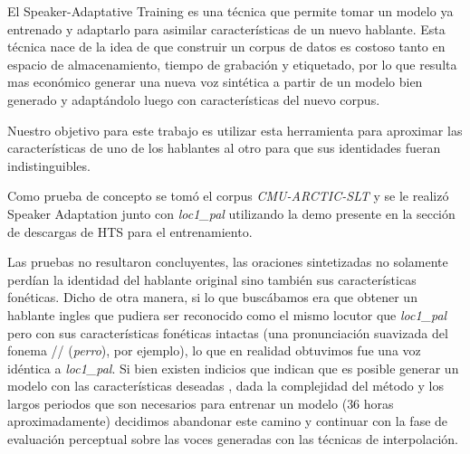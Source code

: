 El Speaker-Adaptative Training es una técnica que permite tomar un modelo ya entrenado y adaptarlo para asimilar características de un nuevo hablante. Esta técnica nace de la idea de que construir un corpus de datos es costoso tanto en espacio de almacenamiento, tiempo de grabación y etiquetado, por lo que resulta mas económico generar una nueva voz sintética a partir de un modelo bien generado y adaptándolo luego con características del nuevo corpus.

Nuestro objetivo para este trabajo es utilizar esta herramienta para aproximar las características de uno de los hablantes al otro para que sus identidades fueran indistinguibles.

Como prueba de concepto se tomó el corpus \textit{CMU-ARCTIC-SLT} y se le realizó Speaker Adaptation junto con \textit{loc1\_pal} utilizando la demo presente en la sección de descargas de HTS para el entrenamiento. 

Las pruebas no resultaron concluyentes, las oraciones sintetizadas no solamente perdían la identidad del hablante original sino también sus características fonéticas. Dicho de otra manera, si lo que buscábamos era que obtener un hablante ingles que pudiera ser reconocido como el mismo locutor que \textit{loc1\_pal} pero con sus características fonéticas intactas (una pronunciación suavizada del fonema // (\textit{perro}), por ejemplo), lo que en realidad obtuvimos fue una voz idéntica a \textit{loc1\_pal}. Si bien existen indicios que indican que es posible generar un modelo con las características deseadas\cite{statisticalParam} \cite{speakerSim}, dada la complejidad del método y los largos periodos que son necesarios para entrenar un modelo ($36$ horas aproximadamente) decidimos abandonar este camino y continuar con la fase de evaluación perceptual sobre las voces generadas con las técnicas de interpolación.